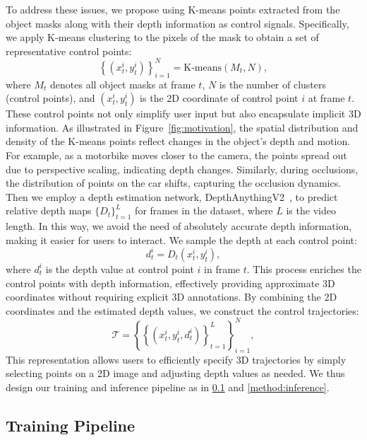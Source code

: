 To address these issues, we propose using K-means points extracted from the object masks along with their depth information as control signals. Specifically, we apply K-means clustering to the pixels of the mask to obtain a set of representative control points:
\begin{equation}
\left\{ (x_t^i, y_t^i) \right\}_{i=1}^N = \text{K-means}(M_t, N),
\end{equation}
where $M_t$ denotes all object masks at frame $t$, $N$ is the number of clusters (control points), and $(x_t^i, y_t^i)$ is the 2D coordinate of control point $i$ at frame $t$.
These control points not only simplify user input but also encapsulate implicit 3D information. As illustrated in Figure~\ref{fig:motivation}, the spatial distribution and density of the K-means points reflect changes in the object's depth and motion. For example, as a motorbike moves closer to the camera, the points spread out due to perspective scaling, indicating depth changes. Similarly, during occlusions, the distribution of points on the car shifts, capturing the occlusion dynamics.
Then we employ a depth estimation network, DepthAnythingV2~\cite{depth_anything_v2}, to predict relative depth maps $\{ D_t \}_{t=1}^L$ for frames in the dataset, where $L$ is the video length. In this way, we avoid the need of absolutely accurate depth information, making it easier for users to interact. We sample the depth at each control point:
\begin{equation}
d_t^i = D_t(x_t^i, y_t^i),
\end{equation}
where $d_t^i$ is the depth value at control point $i$ in frame $t$. This process enriches the control points with depth information, effectively providing approximate 3D coordinates without requiring explicit 3D annotations. By combining the 2D coordinates and the estimated depth values, we construct the control trajectories:
\begin{equation}
    \mathcal{T} = \left\{ \left\{ \left( x_t^i, y_t^i, d_t^i \right) \right\}_{t=1}^L \right\}_{i=1}^N,
\end{equation}
This representation allows users to efficiently specify 3D trajectories by simply selecting points on a 2D image and adjusting depth values as needed. We thus design our training and inference pipeline as in \cref{method:training} and \cref{method:inference}.





\subsection{Training Pipeline}
\label{method:training}

